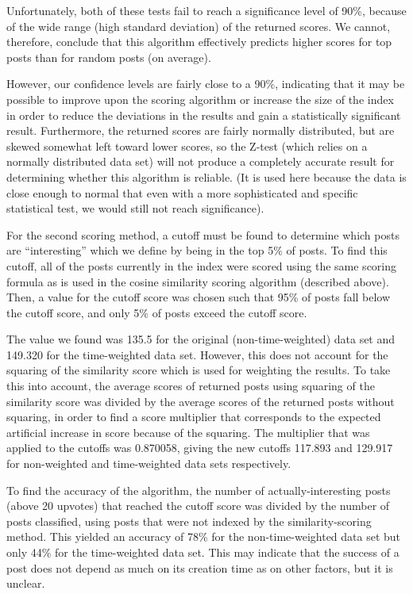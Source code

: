 \documentclass{acm_proc_article-sp}
\begin{document}
Unfortunately, both of these tests fail to reach a significance level of 90\%, because of the wide range (high standard
deviation) of the returned scores.  We cannot, therefore, conclude that this algorithm effectively predicts higher scores
for top posts than for random posts (on average).

However, our confidence levels are fairly close to a 90\%, indicating that it may be possible to improve upon the
scoring algorithm or increase the size of the index in order to reduce the deviations in the results and gain a
statistically significant result.  Furthermore, the returned scores are fairly normally distributed, but are skewed
somewhat left toward lower scores, so the Z-test (which relies on a normally distributed data set) will not produce
a completely accurate result for determining whether this algorithm is reliable.  (It is used here because the data
is close enough to normal that even with a more sophisticated and specific statistical test, we would still not reach
significance).

For the second scoring method, a cutoff must be found to determine which posts are ``interesting'' which we define by
being in the top 5\% of posts.  To find this cutoff, all of the posts currently in the index were scored using the
same scoring formula as is used in the cosine similarity scoring algorithm (described above).  Then, a value for
the cutoff score was chosen such that 95\% of posts fall below the cutoff score, and only 5\% of posts exceed the
cutoff score.

The value we found was 135.5 for the original (non-time-weighted) data set and 149.320 for the time-weighted data set.
However, this does not account for the squaring of the similarity score which is used for weighting the results.  To
take this into account, the average scores of returned posts using squaring of the similarity score was divided by the average
scores of the returned posts without squaring, in order to find a score multiplier that corresponds to the 
expected artificial increase in score because of the squaring.  The multiplier that was applied to the cutoffs
was 0.870058, giving the new cutoffs 117.893 and 129.917 for non-weighted and time-weighted data sets respectively.

To find the accuracy of the algorithm, the number of actually-interesting posts (above 20 upvotes) that reached
the cutoff score was divided by the number of posts classified, using posts that were not indexed by the
similarity-scoring method.  This yielded an accuracy of 78\% for the non-time-weighted data set but only 44\% for
the time-weighted data set.  This may indicate that the success of a post does not depend as much on its creation
time as on other factors, but it is unclear.
\end{document}

